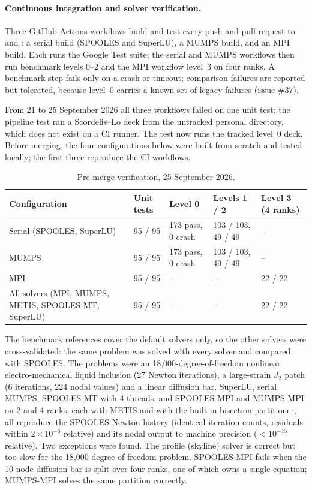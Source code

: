 \documentclass[11pt,a4paper]{article}
\DeclareRobustCommand{\code}[1]{\texttt{\seqsplit{#1}}}
\begin{document}
\paragraph{Continuous integration and solver verification.}
Three GitHub Actions workflows build and test every push and pull request to \code{develop} and
\code{master}: a serial build (SPOOLES and SuperLU), a MUMPS build, and an MPI build. Each runs the
Google Test suite; the serial and MUMPS workflows then run benchmark levels 0--2 and the MPI
workflow level~3 on four ranks. A benchmark step fails only on a crash or timeout; comparison
failures are reported but tolerated, because level~0 carries a known set of legacy failures
(issue \#37).

From 21 to 25 September 2026 all three workflows failed on one unit test: the pipeline test ran a
Scordelis--Lo deck from the untracked personal \code{applications/} directory, which does not exist
on a CI runner. The test now runs the tracked level~0 deck. Before merging, the four configurations
below were built from scratch and tested locally; the first three reproduce the CI workflows.

\begin{table}[h]
\centering\small
\caption{Pre-merge verification, 25 September 2026.}\label{tab:ci}
\begin{tabular}{@{}lllll@{}}
\toprule
Configuration & Unit tests & Level 0 & Levels 1 / 2 & Level 3 (4 ranks) \\
\midrule
Serial (SPOOLES, SuperLU) & 95 / 95 & 173 pass, 0 crash & 103 / 103, 49 / 49 & -- \\
MUMPS & 95 / 95 & 173 pass, 0 crash & 103 / 103, 49 / 49 & -- \\
MPI & 95 / 95 & -- & -- & 22 / 22 \\
All solvers (MPI, MUMPS, METIS, SPOOLES-MT, SuperLU) & 95 / 95 & -- & -- & 22 / 22 \\
\bottomrule
\end{tabular}
\end{table}

The benchmark references cover the default solvers only, so the other solvers were
cross-validated: the same problem was solved with every solver and compared with SPOOLES. The
problems were an 18{,}000-degree-of-freedom nonlinear electro-mechanical liquid inclusion (27 Newton
iterations), a large-strain $J_2$ patch (6 iterations, 224 nodal values) and a linear diffusion bar.
SuperLU, serial MUMPS, SPOOLES-MT with 4 threads, and SPOOLES-MPI and MUMPS-MPI on 2 and 4 ranks,
each with METIS and with the built-in bisection partitioner, all reproduce the SPOOLES Newton
history (identical iteration counts, residuals within $2\times10^{-6}$ relative) and its nodal
output to machine precision ($<10^{-15}$ relative). Two exceptions were found. The profile (skyline)
solver is correct but too slow for the 18{,}000-degree-of-freedom problem. SPOOLES-MPI fails when the
10-node diffusion bar is split over four ranks, one of which owns a single equation; MUMPS-MPI solves
the same partition correctly.
\end{document}
